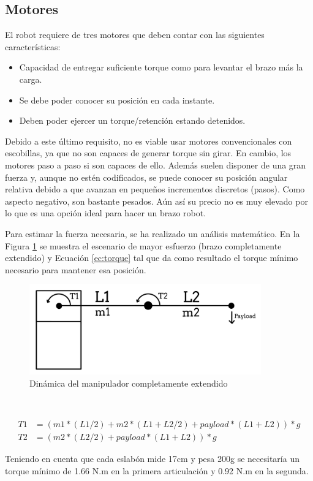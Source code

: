 \subsection{Motores}
\noindent El robot requiere de tres motores que deben contar con las siguientes características:
\begin{itemize}
  \item Capacidad de entregar suficiente torque como para levantar el brazo más la carga.
  \item Se debe poder conocer su posición en cada instante.
  \item Deben poder ejercer un torque/retención estando detenidos.
\end{itemize}

Debido a este último requisito, no es viable usar motores convencionales con escobillas, ya que no son 
capaces de generar torque sin girar. En cambio, los motores paso a paso si son capaces de ello. Además 
suelen disponer de una gran fuerza y, aunque no estén codificados, se puede conocer su posición angular relativa debido a que avanzan en 
pequeños incrementos discretos (pasos). Como aspecto negativo, son bastante pesados. Aún así su precio no es muy elevado por lo que es 
una opción ideal para hacer un brazo robot. 

Para estimar la fuerza necesaria, se ha realizado un análisis matemático. En la Figura \ref{fig:torque} se muestra el 
escenario de mayor esfuerzo (brazo completamente extendido) y Ecuación \ref{ec:torque} tal que da como resultado 
el torque mínimo necesario para mantener esa posición.

\begin{figure} [ht!]
  \begin{center}
    \includegraphics[width=10cm]{figs/torque.jpeg}
  \end{center}
  \caption{Dinámica del manipulador completamente extendido}
  \label{fig:torque}
\end{figure}\ 


\begin{myequation}[h!]
  \begin{equation}
    \begin{aligned}
      T1 &= (m1*(L1/2) + m2*(L1 + L2/2) + payload*(L1 + L2))*g\\
      T2 &= (m2 *(L2/2) + payload*(L1 + L2))*g
  \nonumber
    \end{aligned}
  \end{equation}
  \caption[Cálculo del torque necesario en la articulación más demandante]{Cálculo del torque necesario en la articulación más demandante}
  \label{ec:torque}
\end{myequation} 
Teniendo en cuenta que cada eslabón mide 17cm y pesa 200g se necesitaría un torque mínimo de 1.66 N.m en la primera 
articulación y 0.92 N.m en la segunda.

